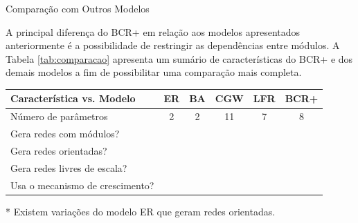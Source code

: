 \begin{section}{Comparação com Outros Modelos}
	
	A principal diferença do BCR+ em relação aos modelos apresentados anteriormente é a possibilidade de restringir as dependências entre módulos. A Tabela \ref{tab:comparacao} apresenta um sumário de características do BCR+ e dos demais modelos a fim de possibilitar uma comparação mais completa.

\renewcommand{\S}{\CheckmarkBold}
\newcommand{\N}{\XSolidBrush}
	
\begin{threeparttable}
	\begin{center}
	\caption{Características do modelo BCR+ comparadas aDe características de outros modelos.}
	\label{tab:comparacao}
	\centering
	\begin{tabular}{|l|c|c|c|c|c|}
		\hline
		\textbf{Característica vs. Modelo} & \textbf{ER} & \textbf{BA} & \textbf{CGW} & \textbf{LFR} & \textbf{BCR+} \\
		\hline
		\hline
		Número de parâmetros                      & 2  &  2 & 11  & 7   &  8 \\
		\hline
		Gera redes com módulos?                   & \N & \N & \S & \S & \S \\
		\hline
		Gera redes orientadas?                    & \N\tnote{*} & \N & \S & \S & \S \\ \hline
		Gera redes livres de escala?              & \N & \S & \S & \S & \S \\
		\hline
		Usa o mecanismo de crescimento?           & \N & \S & \S & \N & \S \\
		\hline
	\end{tabular}
	\begin{tablenotes}
	\item[*] Existem variações do modelo ER que geram redes orientadas.
	\end{tablenotes}	
	\end{center}
\end{threeparttable}


\end{section}
